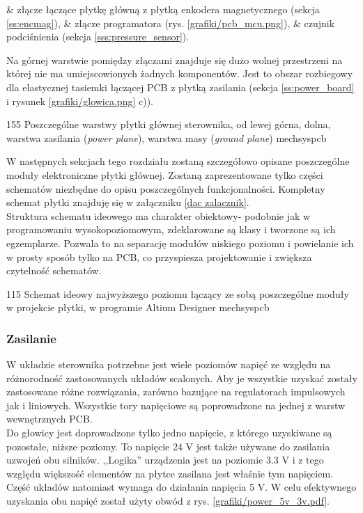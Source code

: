 \begin{easylist}
	& złącze łączące płytkę główną z płytką enkodera magnetycznego (sekcja \ref{ss:encmag}),
	& złącze programatora (rys. \ref{grafiki/pcb_mcu.png}), 
	& czujnik podciśnienia (sekcja \ref{sss:pressure_sensor}).
	\\
\end{easylist}

Na górnej warstwie pomiędzy złączami znajduje się dużo wolnej przestrzeni na której nie ma umiejscowionych żadnych komponentów. Jest to obszar rozbiegowy dla elastycznej tasiemki łączącej PCB z płytką zasilania (sekcja \ref{ss:power_board} i rysunek \ref{grafiki/glowica.png} c)).

	{155}
	{Poszczególne warstwy płytki głównej sterownika, od lewej górna, dolna, warstwa zasilania ({\it power plane}), warstwa masy ({\it ground plane})}
	{mechsyspcb}

W następnych sekcjach tego rozdziału zostaną szczegółowo opisane poszczególne moduły elektroniczne płytki głównej. Zostaną zaprezentowane tylko części schematów niezbędne do opisu poszczególnych funkcjonalności. Kompletny schemat płytki znajduję się w załączniku \ref{dac zalacznik}. \\
	
Struktura schematu ideowego ma charakter obiektowy- podobnie jak w programowaniu wysokopoziomowym, zdeklarowane są klasy i tworzone są ich egzemplarze. Pozwala to na separację modułów niskiego poziomu i powielanie ich w prosty sposób tylko na PCB, co przyspiesza projektowanie i zwiększa czytelność schematów.

	{115}
	{Schemat ideowy najwyższego poziomu łączący ze sobą poszczególne moduły w projekcie płytki, w programie Altium Designer}
	{mechsyspcb}

\subsubsection{Zasilanie}

W układzie sterownika potrzebne jest wiele poziomów napięć ze względu na różnorodność zastosowanych układów scalonych. Aby je wszystkie uzyskać zostały zastosowane różne rozwiązania, zarówno bazujące na regulatorach impulsowych jak i liniowych. Wszystkie tory napięciowe są poprowadzone na jednej z warstw wewnętrznych PCB. \\

Do głowicy jest doprowadzone tylko jedno napięcie, z którego uzyskiwane są pozostałe, niższe poziomy. To napięcie 24 V  jest także używane do zasilania uzwojeń obu silników. ,,Logika'' urządzenia jest na poziomie 3.3 V i z tego względu większość elementów na płytce zasilana jest właśnie tym napięciem. Część układów natomiast wymaga do działania napięcia 5 V. W celu efektywnego uzyskania obu napięć został użyty obwód z rys. \ref{grafiki/power_5v_3v.pdf}.

